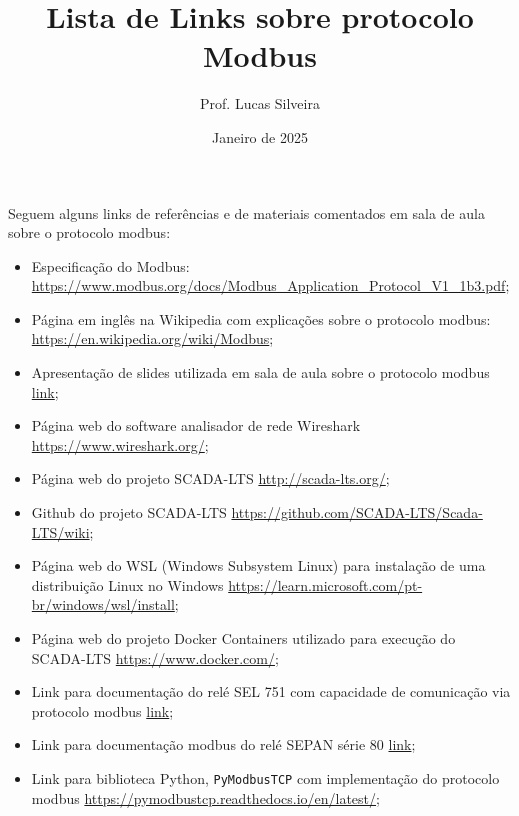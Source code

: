 \documentclass[12pt
]{article}
\title{Lista de Links sobre protocolo Modbus}
\author{Prof. Lucas Silveira}
\date{Janeiro de 2025}
\providecommand{\tightlist}{%
  \setlength{\itemsep}{10pt}
  \setlength{\parskip}{0pt}}
\begin{document}
\maketitle

Seguem alguns links de referências e de materiais comentados em sala de
aula sobre o protocolo modbus:

\begin{itemize}
\tightlist
\item
  Especificação do Modbus: \url{https://www.modbus.org/docs/Modbus_Application_Protocol_V1_1b3.pdf};
\item
  Página em inglês na Wikipedia com explicações sobre o protocolo
  modbus: \url{https://en.wikipedia.org/wiki/Modbus};
\item
  Apresentação de slides utilizada em sala de aula sobre o protocolo
  modbus
  \href{https://drive.google.com/file/d/1dzLf-euv6dNQS82yvl6RlspNYL8PkfPy/view?usp=drive_link}{link};
\item
  Página web do software analisador de rede Wireshark
  \url{https://www.wireshark.org/};
\item
  Página web do projeto SCADA-LTS \url{http://scada-lts.org/};
\item
  Github do projeto SCADA-LTS
  \url{https://github.com/SCADA-LTS/Scada-LTS/wiki};
\item
  Página web do WSL (Windows Subsystem Linux) para instalação de uma
  distribuição Linux no Windows
  \url{https://learn.microsoft.com/pt-br/windows/wsl/install};
\item
  Página web do projeto Docker Containers utilizado para execução do
  SCADA-LTS \url{https://www.docker.com/};
\item
  Link para documentação do relé SEL 751 com capacidade de comunicação
  via protocolo modbus
  \href{https://drive.google.com/file/d/1_X_TWn8YUtYiy13mjku66pRBING1N2Ed/view?usp=drive_link}{link};
\item
  Link para documentação modbus do relé SEPAN série 80
  \href{https://drive.google.com/file/d/1mkT6fXqQvDHMV-ROjgld160GoYlrHh5H/view?usp=drive_link}{link};
\item
  Link para biblioteca Python, \texttt{PyModbusTCP} com implementação do
  protocolo modbus \url{https://pymodbustcp.readthedocs.io/en/latest/};
\end{itemize}
\end{document}
